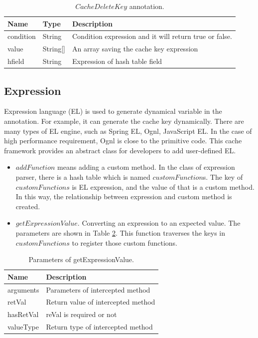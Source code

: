 \documentclass{singlecol-new}
\theoremstyle{TH}{
\newtheorem{lemma}{Lemma}
\newtheorem{theorem}[lemma]{Theorem}
\newtheorem{corrolary}[lemma]{Corrolary}
\newtheorem{conjecture}[lemma]{Conjecture}
\newtheorem{proposition}[lemma]{Proposition}
\newtheorem{claim}[lemma]{Claim}
\newtheorem{stheorem}[lemma]{Wrong Theorem}
}
\theoremstyle{THrm}{
\newtheorem{definition}{Definition}[section]
\newtheorem{question}{Question}[section]
\newtheorem{remark}{Remark}
\newtheorem{scheme}{Scheme}
}
\theoremstyle{THhit}{
\newtheorem{case}{Case}[section]
}
\begin{document}
\begin{table}[htb]
\begin{center}
 \caption{\label{CacheDeleteKey}$CacheDeleteKey$ annotation.}
 \begin{tabular}{lll}
 \toprule
Name & Type & Description\\
 \midrule
condition & String & Condition expression and it will return true or false.\\ %
value & String[] & An array saving the cache key expression\\
hfield & String & Expression of hash table field\\
\bottomrule
 \end{tabular}
\end{center}
\end{table}

\subsection{Expression}
Expression language (EL) is used to generate dynamical variable in the annotation. For example, it can generate the cache key dynamically. There are many types of EL engine, such as Spring EL, Ognl, JavaScript EL. In the case of high performance requirement, Ognl is close to the primitive code. This cache framework provides an abstract class for developers to add user-defined EL.

\begin{itemize}
  \item $addFunction$ means adding a custom method. In the class of expression parser, there is a hash table which is named $customFunction$s. The key of $customFunctions$ is EL expression, and the value of that is a custom method. In this way, the relationship between expression and custom method is created.
  \item $getExpressionValue$. Converting an expression to an expected value. The parameters are shown in Table \ref{getExpressionValue}. This function traverses the keys in $customFunctions$ to register those custom functions.
\end{itemize}

\begin{table}[htb]
\begin{center}
 \caption{\label{getExpressionValue}Parameters of getExpressionValue.}
 \begin{tabular}{ll}
 \toprule
Name & Description\\
 \midrule
arguments & Parameters of intercepted method\\
retVal & Return value of intercepted method\\
hasRetVal & reVal is required or not\\
valueType & Return type of intercepted method\\
\bottomrule
 \end{tabular}
\end{center}
\end{table}
\end{document}
